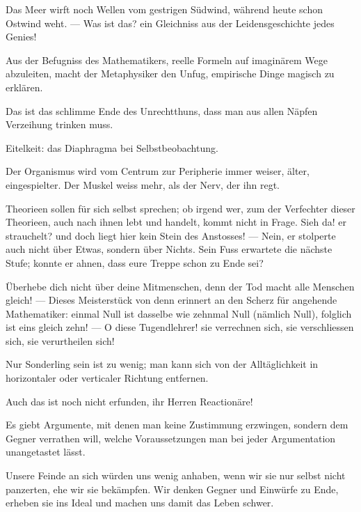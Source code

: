 Das Meer wirft noch Wellen vom gestrigen Südwind, während heute schon Ostwind weht. — Was ist das? ein Gleichniss aus der Leidensgeschichte jedes Genies!
\par

Aus der Befugniss des Mathematikers, reelle Formeln auf imaginärem Wege abzuleiten, macht der Metaphysiker den Unfug, empirische Dinge magisch zu erklären.
\par

Das ist das schlimme Ende des Unrechtthuns, dass man aus allen Näpfen Verzeihung trinken muss.
\par

Eitelkeit: das Diaphragma bei Selbstbeobachtung.
\par

Der Organismus wird vom Centrum zur Peripherie immer weiser, älter, eingespielter. Der Muskel weiss mehr, als der Nerv, der ihn regt.
\par

Theorieen sollen für sich selbst sprechen; ob irgend wer, zum  der Verfechter dieser Theorieen, auch nach ihnen lebt und handelt, kommt nicht in Frage. Sieh da! er strauchelt? und doch liegt hier kein Stein des Anstosses! — Nein, er stolperte auch nicht über Etwas, sondern über Nichts. Sein Fuss erwartete die nächste Stufe; konnte er ahnen, dass eure Treppe schon zu Ende sei?
\par

Überhebe dich nicht über deine Mitmenschen, denn der Tod macht alle Menschen gleich! — Dieses Meisterstück von denn erinnert an den Scherz für angehende Mathematiker: einmal Null ist dasselbe wie zehnmal Null (nämlich Null), folglich ist eins gleich zehn! — O diese Tugendlehrer! sie verrechnen sich, sie verschliessen sich, sie verurtheilen sich!
\par

Nur Sonderling sein ist zu wenig; man kann sich von der Alltäglichkeit in horizontaler oder verticaler Richtung entfernen.
\par

Auch das  ist noch nicht erfunden, ihr Herren Reactionäre!
\par

Es giebt Argumente, mit denen man keine Zustimmung erzwingen, sondern dem Gegner verrathen will, welche Voraussetzungen man bei jeder Argumentation unangetastet lässt.
\par

Unsere Feinde an sich würden uns wenig anhaben, wenn wir sie nur selbst nicht panzerten, ehe wir sie bekämpfen. Wir denken Gegner und Einwürfe zu Ende, erheben sie ins Ideal und machen uns damit das Leben schwer.
\par

